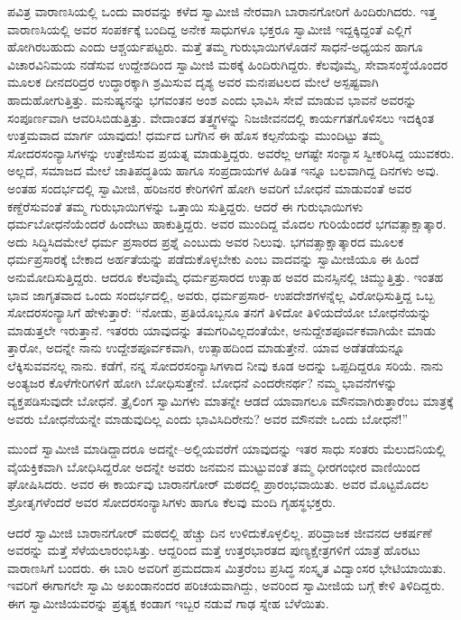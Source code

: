 ಪವಿತ್ರ ವಾರಾಣಸಿಯಲ್ಲಿ ಒಂದು ವಾರವನ್ನು ಕಳೆದ ಸ್ವಾಮೀಜಿ ನೇರವಾಗಿ ಬಾರಾನಗೋರಿಗೆ ಹಿಂದಿರುಗಿದರು. ಇತ್ತ ವಾರಾಣಸಿಯಲ್ಲಿ ಅವರ ಸಂಪರ್ಕಕ್ಕೆ ಬಂದಿದ್ದ ಅನೇಕ ಸಾಧುಗಳೂ ಭಕ್ತರೂ ಸ್ವಾಮೀಜಿ ಇದ್ದಕ್ಕಿದ್ದಂತೆ ಎಲ್ಲಿಗೆ ಹೋಗಿರಬಹುದು ಎಂದು ಆಶ್ಚರ್ಯಪಟ್ಟರು. ಮತ್ತೆ ತಮ್ಮ ಗುರುಭಾಯಿಗಳೊಡನೆ ಸಾಧನೆ-ಅಧ್ಯಯನ ಹಾಗೂ ವಿಚಾರವಿನಿಮಯ ನಡೆಸುವ ಉದ್ದೇಶದಿಂದ ಸ್ವಾಮೀಜಿ ಮಠಕ್ಕೆ ಹಿಂದಿರುಗಿದ್ದರು. ಕೆಲವೊಮ್ಮೆ, ಸೇವಾಸಂಸ್ಥೆಯೊಂದರ ಮೂಲಕ ದೀನದರಿದ್ರರ ಉದ್ಧಾರಕ್ಕಾಗಿ ಶ್ರಮಿಸುವ ದೃಶ್ಯ ಅವರ ಮನಃಪಟಲದ ಮೇಲೆ ಅಸ್ಪಷ್ಟವಾಗಿ ಹಾದುಹೋಗುತ್ತಿತ್ತು. ಮನುಷ್ಯನನ್ನು ಭಗವಂತನ ಅಂಶ ಎಂದು ಭಾವಿಸಿ ಸೇವೆ ಮಾಡುವ ಭಾವನೆ ಅವರನ್ನು ಸಂಪೂರ್ಣವಾಗಿ ಆವರಿಸಿಬಿಡುತ್ತಿತ್ತು. ವೇದಾಂತದ ತತ್ತ್ವಗಳನ್ನು ನಿಜಜೀವನದಲ್ಲಿ ಕಾರ್ಯಗತಗೊಳಿಸಲು ಇದಕ್ಕಿಂತ ಉತ್ತಮವಾದ ಮಾರ್ಗ ಯಾವುದು! ಧರ್ಮದ ಬಗೆಗಿನ ಈ ಹೊಸ ಕಲ್ಪನೆಯನ್ನು ಮುಂದಿಟ್ಟು ತಮ್ಮ ಸೋದರಸಂನ್ಯಾಸಿಗಳನ್ನು ಉತ್ತೇಜಿಸುವ ಪ್ರಯತ್ನ ಮಾಡುತ್ತಿದ್ದರು. ಅವರೆಲ್ಲ ಆಗಷ್ಟೇ ಸಂನ್ಯಾಸ ಸ್ವೀಕರಿಸಿದ್ದ ಯುವಕರು. ಅಲ್ಲದೆ, ಸಮಾಜದ ಮೇಲೆ ಜಾತಿಪದ್ಧತಿಯ ಹಾಗೂ ಸಂಪ್ರದಾಯಗಳ ಹಿಡಿತ ಇನ್ನೂ ಬಲವಾಗಿದ್ದ ದಿನಗಳು ಅವು. ಅಂತಹ ಸಂದರ್ಭದಲ್ಲಿ ಸ್ವಾಮೀಜಿ, ಹರಿಜನರ ಕೇರಿಗಳಿಗೆ ಹೋಗಿ ಅವರಿಗೆ ಬೋಧನೆ ಮಾಡುವಂತೆ ಅವರ ಕಣ್ದೆರೆಸುವಂತೆ ತಮ್ಮ ಗುರುಭಾಯಿಗಳನ್ನು ಒತ್ತಾಯಿ ಸುತ್ತಿದ್ದರು. ಆದರೆ ಈ ಗುರುಭಾಯಿಗಳು ಧರ್ಮಬೋಧನೆಯೆಂದರೆ ಹಿಂದೇಟು ಹಾಕುತ್ತಿದ್ದರು. ಅವರ ಮುಂದಿದ್ದ ಮೊದಲ ಗುರಿಯೆಂದರೆ ಭಗವತ್ಸಾಕ್ಷಾತ್ಕಾರ. ಅದು ಸಿದ್ಧಿಸಿದಮೇಲೆ ಧರ್ಮ ಪ್ರಸಾರದ ಪ್ರಶ್ನೆ ಎಂಬುದು ಅವರ ನಿಲುವು. ಭಗವತ್ಸಾಕ್ಷಾತ್ಕಾರದ ಮೂಲಕ ಧರ್ಮಪ್ರಸಾರಕ್ಕೆ ಬೇಕಾದ ಅರ್ಹತೆಯನ್ನು ಪಡೆದುಕೊಳ್ಳಬೇಕು ಎಂಬ ವಾದವನ್ನು ಸ್ವಾಮೀಜಿಯೂ ಈ ಹಿಂದೆ ಅನುಮೋದಿಸುತ್ತಿದ್ದರು. ಆದರೂ ಕೆಲವೊಮ್ಮೆ ಧರ್ಮಪ್ರಸಾರದ ಉತ್ಸಾಹ ಅವರ ಮನಸ್ಸಿನಲ್ಲಿ ಚಿಮ್ಮುತ್ತಿತ್ತು. ಇಂತಹ ಭಾವ ಜಾಗೃತವಾದ ಒಂದು ಸಂದರ್ಭದಲ್ಲಿ, ಅವರು, ಧರ್ಮಪ್ರಸಾರ- ಉಪದೇಶಗಳನ್ನೆಲ್ಲ ವಿರೋಧಿಸುತ್ತಿದ್ದ ಒಬ್ಬ ಸೋದರಸಂನ್ಯಾಸಿಗೆ ಹೇಳುತ್ತಾರೆ: “ನೋಡು, ಪ್ರತಿಯೊಬ್ಬನೂ ತನಗೆ ತಿಳಿದೋ ತಿಳಿಯದೆಯೋ ಬೋಧನೆಯನ್ನು ಮಾಡುತ್ತಲೇ ಇರುತ್ತಾನೆ. ಇತರರು ಯಾವುದನ್ನು ತಮಗರಿವಿಲ್ಲದಂತೆಯೇ, ಅನುದ್ದೇಶಪೂರ್ವಕವಾಗಿಯೇ ಮಾಡು ತ್ತಾರೋ, ಅದನ್ನೇ ನಾನು ಉದ್ದೇಶಪೂರ್ವಕವಾಗಿ, ಉತ್ಸಾಹದಿಂದ ಮಾಡುತ್ತೇನೆ. ಯಾವ ಅಡೆತಡೆಯನ್ನೂ ಲೆಕ್ಕಿಸುವವನಲ್ಲ ನಾನು. ಕಡೆಗೆ, ನನ್ನ ಸೋದರಸಂನ್ಯಾಸಿಗಳಾದ ನೀವು ಕೂಡ ಅದನ್ನು ಒಪ್ಪದಿದ್ದರೂ ಸರಿಯೆ. ನಾನು ಅಂತ್ಯಜರ ಕೊಳೆಗೇರಿಗಳಿಗೆ ಹೋಗಿ ಬೋಧಿಸುತ್ತೇನೆ. ಬೋಧನೆ ಎಂದರೇನರ್ಥ? ನಮ್ಮ ಭಾವನೆಗಳನ್ನು ವ್ಯಕ್ತಪಡಿಸುವುದೇ ಬೋಧನೆ. ತ್ರೈಲಿಂಗ ಸ್ವಾಮಿಗಳು ಮಾತನ್ನೇ ಆಡದೆ ಯಾವಾಗಲೂ ಮೌನವಾಗಿರುತ್ತಾರೆಂಬ ಮಾತ್ರಕ್ಕೆ ಅವರು ಬೋಧನೆಯನ್ನೇ ಮಾಡುವುದಿಲ್ಲ ಎಂದು ಭಾವಿಸಿದಿರೇನು? ಅವರ ಮೌನವೇ ಒಂದು ಬೋಧನೆ!”

ಮುಂದೆ ಸ್ವಾಮೀಜಿ ಮಾಡಿದ್ದಾದರೂ ಅದನ್ನೇ–ಅಲ್ಲಿಯವರೆಗೆ ಯಾವುದನ್ನು ಇತರ ಸಾಧು ಸಂತರು ಮೆಲುದನಿಯಲ್ಲಿ ವೈಯಕ್ತಿಕವಾಗಿ ಬೋಧಿಸಿದ್ದರೋ ಅದನ್ನೇ ಅವರು ಜನಮನ ಮುಟ್ಟುವಂತೆ ತಮ್ಮ ಧೀರಗಂಭೀರ ವಾಣಿಯಿಂದ ಘೋಷಿಸಿದರು. ಅವರ ಈ ಕಾರ್ಯವು ಬಾರಾನಗೋರ್ ಮಠದಲ್ಲಿ ಪ್ರಾರಂಭವಾಯಿತು. ಅವರ ಮೊಟ್ಟಮೊದಲ ಶ್ರೋತೃಗಳೆಂದರೆ ಅವರ ಸೋದರಸಂನ್ಯಾಸಿಗಳು ಹಾಗೂ ಕೆಲವು ಮಂದಿ ಗೃಹಸ್ಥಭಕ್ತರು.

ಆದರೆ ಸ್ವಾಮೀಜಿ ಬಾರಾನಗೋರ್ ಮಠದಲ್ಲಿ ಹೆಚ್ಚು ದಿನ ಉಳಿದುಕೊಳ್ಳಲಿಲ್ಲ. ಪರಿವ್ರಾಜಕ ಜೀವನದ ಆಕರ್ಷಣೆ ಅವರನ್ನು ಮತ್ತೆ ಸೆಳೆಯಲಾರಂಭಿಸಿತ್ತು. ಆದ್ದರಿಂದ ಮತ್ತೆ ಉತ್ತರಭಾರತದ ಪುಣ್ಯಕ್ಷೇತ್ರಗಳಿಗೆ ಯಾತ್ರೆ ಹೊರಟು ವಾರಾಣಸಿಗೆ ಬಂದರು. ಈ ಬಾರಿ ಅವರಿಗೆ ಪ್ರಮದದಾಸ ಮಿತ್ರರೆಂಬ ಪ್ರಸಿದ್ಧ ಸಂಸ್ಕೃತ ವಿದ್ವಾಂಸರ ಭೇಟಿಯಾಯಿತು. ಇವರಿಗೆ ಈಗಾಗಲೇ ಸ್ವಾಮಿ ಅಖಂಡಾನಂದರ ಪರಿಚಯವಾಗಿದ್ದು, ಅವರಿಂದ ಸ್ವಾಮೀಜಿಯ ಬಗ್ಗೆ ಕೇಳಿ ತಿಳಿದಿದ್ದರು. ಈಗ ಸ್ವಾಮೀಜಿಯವರನ್ನು ಪ್ರತ್ಯಕ್ಷ ಕಂಡಾಗ ಇಬ್ಬರ ನಡುವೆ ಗಾಢ ಸ್ನೇಹ ಬೆಳೆಯಿತು.

